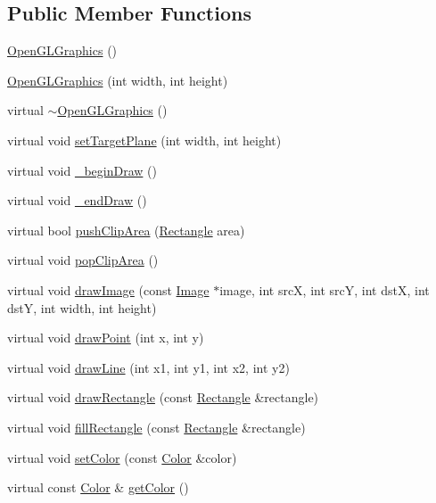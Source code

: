 \subsection*{Public Member Functions}
\begin{DoxyCompactItemize}
\item 
\hyperlink{classgcn_1_1OpenGLGraphics_a83ecb7fec98abf85aec6f1fa8fea7421}{Open\+G\+L\+Graphics} ()
\item 
\hyperlink{classgcn_1_1OpenGLGraphics_aa10bce08f86628580af9ff1e93629ed5}{Open\+G\+L\+Graphics} (int width, int height)
\item 
virtual \hyperlink{classgcn_1_1OpenGLGraphics_a03b7f97b6578a08837926a924f4c009e}{$\sim$\+Open\+G\+L\+Graphics} ()
\item 
virtual void \hyperlink{classgcn_1_1OpenGLGraphics_a0c46ad9197da7954eb3d2579448107e4}{set\+Target\+Plane} (int width, int height)
\item 
virtual void \hyperlink{classgcn_1_1OpenGLGraphics_a48173540d3ea957c6ecb7baeb4e48772}{\+\_\+begin\+Draw} ()
\item 
virtual void \hyperlink{classgcn_1_1OpenGLGraphics_abf1f271776344b1aa28b5eb0faf8bc1d}{\+\_\+end\+Draw} ()
\item 
virtual bool \hyperlink{classgcn_1_1OpenGLGraphics_ad1929d5ca4171cf22158b3c6235de3b3}{push\+Clip\+Area} (\hyperlink{classgcn_1_1Rectangle}{Rectangle} area)
\item 
virtual void \hyperlink{classgcn_1_1OpenGLGraphics_a2435ae6ef201cfcec0500c27115087bd}{pop\+Clip\+Area} ()
\item 
virtual void \hyperlink{classgcn_1_1OpenGLGraphics_a515a05b859bbdbecf484423f74c862fd}{draw\+Image} (const \hyperlink{classgcn_1_1Image}{Image} $\ast$image, int srcX, int srcY, int dstX, int dstY, int width, int height)
\item 
virtual void \hyperlink{classgcn_1_1OpenGLGraphics_a8094c24245810cd52f069c15b3c98b9b}{draw\+Point} (int x, int y)
\item 
virtual void \hyperlink{classgcn_1_1OpenGLGraphics_aa6408f704c9900d9aea987e84a234e1c}{draw\+Line} (int x1, int y1, int x2, int y2)
\item 
virtual void \hyperlink{classgcn_1_1OpenGLGraphics_ae9dac9f5422443c7acbe239d5bca0437}{draw\+Rectangle} (const \hyperlink{classgcn_1_1Rectangle}{Rectangle} \&rectangle)
\item 
virtual void \hyperlink{classgcn_1_1OpenGLGraphics_ac8285ce172eb77ccecc2eceb8c0f1715}{fill\+Rectangle} (const \hyperlink{classgcn_1_1Rectangle}{Rectangle} \&rectangle)
\item 
virtual void \hyperlink{classgcn_1_1OpenGLGraphics_abc2a3c312c4d56a0e806eea924bcf400}{set\+Color} (const \hyperlink{classgcn_1_1Color}{Color} \&color)
\item 
virtual const \hyperlink{classgcn_1_1Color}{Color} \& \hyperlink{classgcn_1_1OpenGLGraphics_ab14f58fff9092bbdd4b8e2a03df3d0fd}{get\+Color} ()
\end{DoxyCompactItemize}
